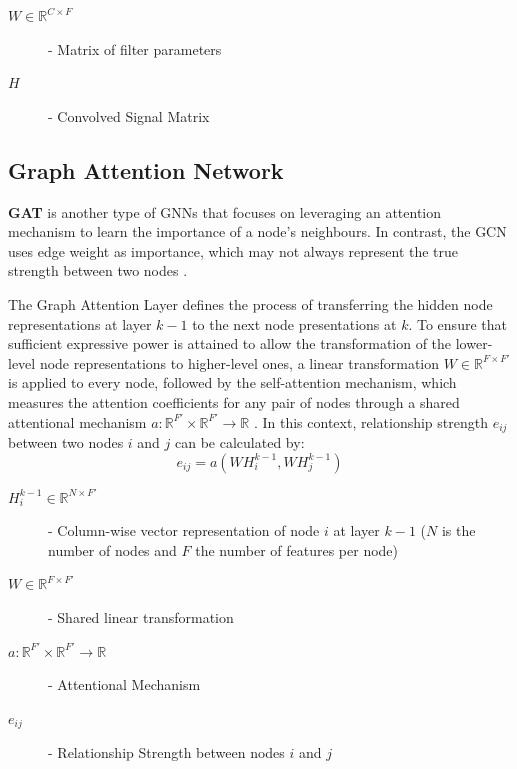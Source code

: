 \begin{description}
	\item[$W \in \mathbb{R}^{C \times F}$] - Matrix of filter parameters
	\item[$H$] - Convolved Signal Matrix
\end{description}


\subsection{Graph Attention Network}

\textbf{\ac{GAT}} \cite{velickovicGraphAttentionNetworks2018} is another type of \acp{GNN} that focuses on leveraging an attention mechanism to learn the importance of a node's neighbours. In contrast, the \ac{GCN} uses edge weight as importance, which may not always represent the true strength between two nodes \cite{tangGraphNeuralNetworks2022, velickovicGraphAttentionNetworks2018}.

The Graph Attention Layer defines the process of transferring the hidden node representations at layer $k - 1$ to the next node presentations at $k$. To ensure that sufficient expressive power is attained to allow the transformation of the lower-level node representations to higher-level ones, a linear transformation $W \in \mathbb{R}^{F \times F'}$ is applied to every node, followed by the self-attention mechanism, which measures the attention coefficients for any pair of nodes through a shared attentional mechanism $a: \mathbb{R}^{F'} \times \mathbb{R}^{F'} \rightarrow \mathbb{R}$ \cite{tangGraphNeuralNetworks2022, velickovicGraphAttentionNetworks2018}. In this context, relationship strength $e_{ij}$ between two nodes $i$ and $j$ can be calculated by:
\begin{equation}
	e_{ij} = a(W H^{k - 1}_i, W H^{k - 1}_j)
\end{equation}

\begin{description}
	\item[$H^{k - 1}_i \in \mathbb{R}^{N \times F'}$] - Column-wise vector representation of node $i$ at layer $k - 1$ ($N$ is the number of nodes and $F$ the number of features per node) 
	\item[$W \in \mathbb{R}^{F \times F'}$] - Shared linear transformation
	\item[$a: \mathbb{R}^{F'} \times \mathbb{R}^{F'} \rightarrow \mathbb{R}$] - Attentional Mechanism
	\item[$e_{ij}$] - Relationship Strength between nodes $i$ and $j$ 
\end{description}


